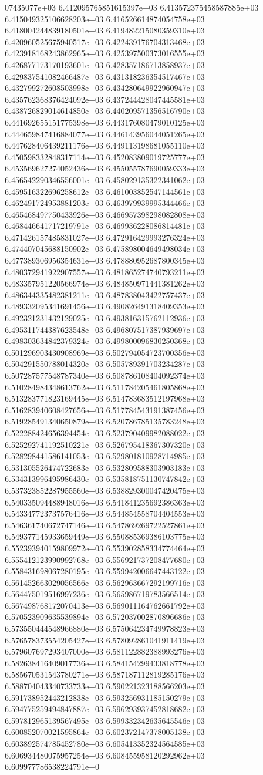 07435077e+03	6.412095765851615397e+03	6.413572375458587885e+03	6.415049325106628203e+03	6.416526614874054758e+03	6.418004244839180501e+03	6.419482215080359310e+03	6.420960525675940517e+03	6.422439176704313468e+03	6.423918168243862965e+03	6.425397500373016555e+03	6.426877173170193601e+03	6.428357186713858937e+03	6.429837541082466487e+03	6.431318236354517467e+03	6.432799272608503998e+03	6.434280649922960947e+03	6.435762368376424092e+03	6.437244428047445581e+03	6.438726829014614850e+03	6.440209571356516790e+03	6.441692655151775398e+03	6.443176080479010125e+03	6.444659847416884077e+03	6.446143956044051265e+03	6.447628406439211176e+03	6.449113198681055110e+03	6.450598332848317114e+03	6.452083809019725777e+03	6.453569627274052436e+03	6.455055787690059333e+03	6.456542290346556001e+03	6.458029135322341062e+03	6.459516322696258612e+03	6.461003852547144561e+03	6.462491724953881203e+03	6.463979939995344466e+03	6.465468497750433926e+03	6.466957398298082808e+03	6.468446641717219791e+03	6.469936228086814481e+03	6.471426157485831027e+03	6.472916429993276324e+03	6.474407045688150902e+03	6.475898004649498034e+03	6.477389306956354631e+03	6.478880952687800345e+03	6.480372941922907557e+03	6.481865274740793211e+03	6.483357951220566974e+03	6.484850971441381262e+03	6.486344335482381211e+03	6.487838043422757437e+03	6.489332095341691456e+03	6.490826491318409353e+03	6.492321231432129025e+03	6.493816315762112936e+03	6.495311744387623548e+03	6.496807517387939697e+03	6.498303634842379324e+03	6.499800096830250368e+03	6.501296903430908969e+03	6.502794054723700356e+03	6.504291550788014320e+03	6.505789391703234287e+03	6.507287577548787340e+03	6.508786108404092374e+03	6.510284984348613762e+03	6.511784205461805868e+03	6.513283771823169445e+03	6.514783683512197968e+03	6.516283940608427656e+03	6.517784543191387456e+03	6.519285491340650879e+03	6.520786785135783248e+03	6.522288424656394454e+03	6.523790409982088022e+03	6.525292741192510221e+03	6.526795418367307320e+03	6.528298441586141053e+03	6.529801810928714985e+03	6.531305526474722683e+03	6.532809588303903183e+03	6.534313996495986430e+03	6.535818751130747842e+03	6.537323852287955560e+03	6.538829300047420475e+03	6.540335094488948016e+03	6.541841235692386363e+03	6.543347723737576416e+03	6.544854558704404553e+03	6.546361740672747146e+03	6.547869269722527861e+03	6.549377145933659449e+03	6.550885369386103775e+03	6.552393940159809972e+03	6.553902858334774464e+03	6.555412123990992768e+03	6.556921737208477680e+03	6.558431698067280195e+03	6.559942006647443122e+03	6.561452663029056566e+03	6.562963667292199716e+03	6.564475019516997236e+03	6.565986719783566514e+03	6.567498768172070413e+03	6.569011164762661792e+03	6.570523909635539894e+03	6.572037002870896686e+03	6.573550444548966880e+03	6.575064234749978823e+03	6.576578373554205427e+03	6.578092861041911419e+03	6.579607697293407000e+03	6.581122882388993276e+03	6.582638416409017736e+03	6.584154299433818778e+03	6.585670531543780271e+03	6.587187112819285176e+03	6.588704043340733733e+03	6.590221323188566203e+03	6.591738952443212838e+03	6.593256931185150279e+03	6.594775259494847887e+03	6.596293937452818682e+03	6.597812965139567495e+03	6.599332342635645546e+03	6.600852070021595864e+03	6.602372147378005138e+03	6.603892574785452780e+03	6.605413352324564585e+03	6.606934480075957254e+03	6.608455958120292962e+03	6.609977786538224791e+0